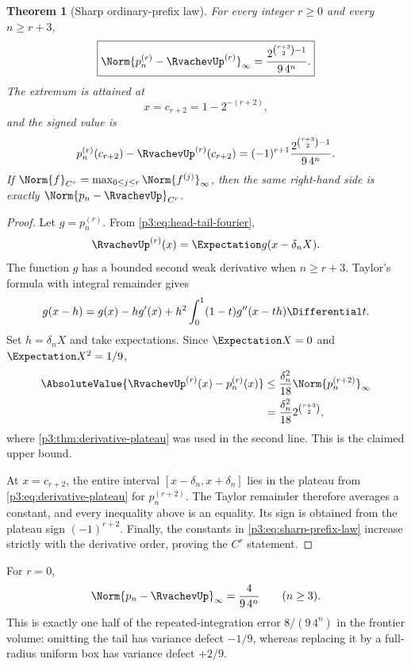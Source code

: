\documentclass[11pt,oneside]{article}
\numberwithin{equation}{section}
\newtheorem{theorem}{Theorem}[section]
\theoremstyle{definition}
\theoremstyle{remark}
\begin{document}
\begin{theorem}[Sharp ordinary-prefix law]
\label{p3:thm:sharp-prefix-law}
For every integer $r\ge0$ and every $n\ge r+3$,
\begin{equation}
 \boxed{
 \Norm{p_n^{(r)}-\RvachevUp^{(r)}}_\infty
 =\frac{2^{\binom{r+3}{2}-1}}{9\,4^n}.}
 \label{p3:eq:sharp-prefix-law}
\end{equation}
The extremum is attained at
\begin{equation}
 x=c_{r+2}=1-2^{-(r+2)},
 \label{p3:eq:error-extremizer}
\end{equation}
and the signed value is
\begin{equation}
 p_n^{(r)}(c_{r+2})-\RvachevUp^{(r)}(c_{r+2})
 =(-1)^{r+1}\frac{2^{\binom{r+3}{2}-1}}{9\,4^n}.
 \label{p3:eq:signed-error-extremizer}
\end{equation}
If
$\Norm{f}_{C^r}=\max_{0\le j\le r}\Norm{f^{(j)}}_\infty$, then the same right-hand
side is exactly $\Norm{p_n-\RvachevUp}_{C^r}$.
\end{theorem}

\begin{proof}
Let $g=p_n^{(r)}$.  From \cref{p3:eq:head-tail-fourier},
\[
 \RvachevUp^{(r)}(x)=\Expectation g(x-\delta_nX).
\]
The function $g$ has a bounded second weak derivative when $n\ge r+3$.
Taylor's formula with integral remainder gives
\[
 g(x-h)=g(x)-hg'(x)+h^2\int_0^1(1-t)g''(x-th)\Differential t.
\]
Set $h=\delta_nX$ and take expectations.  Since $\Expectation X=0$ and $\Expectation X^2=1/9$,
\begin{align*}
 \AbsoluteValue{\RvachevUp^{(r)}(x)-p_n^{(r)}(x)}
 &\le\frac{\delta_n^2}{18}\Norm{p_n^{(r+2)}}_\infty\\
 &=\frac{\delta_n^2}{18}2^{\binom{r+3}{2}},
\end{align*}
where \cref{p3:thm:derivative-plateau} was used in the second line.  This is the claimed
upper bound.

At $x=c_{r+2}$, the entire interval
$[x-\delta_n,x+\delta_n]$ lies in the plateau from
\cref{p3:eq:derivative-plateau} for $p_n^{(r+2)}$.  The Taylor remainder therefore
averages a constant, and every inequality above is an equality.  Its sign is obtained
from the plateau sign $(-1)^{r+2}$.  Finally, the constants in
\cref{p3:eq:sharp-prefix-law} increase strictly with the derivative order, proving the
$C^r$ statement.
\end{proof}

For $r=0$,
\begin{equation}
 \Norm{p_n-\RvachevUp}_\infty=\frac{4}{9\,4^n}
 \qquad(n\ge3).
 \label{p3:eq:sharp-uniform-r0}
\end{equation}
This is exactly one half of the repeated-integration error
$8/(9\,4^n)$ in the frontier volume: omitting the tail has variance defect $-1/9$,
whereas replacing it by a full-radius uniform box has variance defect $+2/9$.
\end{document}
